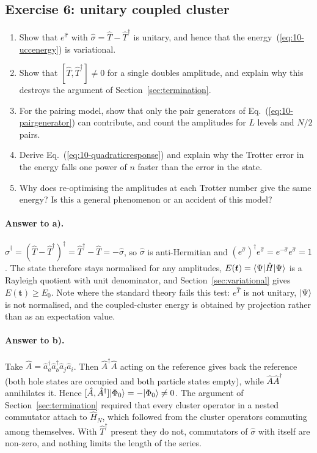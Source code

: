 \subsection*{Exercise 6: unitary coupled cluster}
\label{ex:10-ucc}

\begin{enumerate}
  \item[a)] Show that $e^{\hat{\sigma}}$ with
  $\hat{\sigma}=\hat{T}-\hat{T}^{\dagger}$ is unitary, and hence that the
  energy~(\ref{eq:10-uccenergy}) is variational.
  \item[b)] Show that $[\hat{T},\hat{T}^{\dagger}]\ne0$ for a single doubles
  amplitude, and explain why this destroys the argument of
  Section~\ref{sec:termination}.
  \item[c)] For the pairing model, show that only the pair generators of
  Eq.~(\ref{eq:10-pairgenerator}) can contribute, and count the amplitudes
  for $L$ levels and $N/2$ pairs.
  \item[d)] Derive Eq.~(\ref{eq:10-quadraticresponse}) and explain why the
  Trotter error in the energy falls one power of $n$ faster than the error in
  the state.
  \item[e)] Why does re-optimising the amplitudes at each Trotter number give
  the same energy?  Is this a general phenomenon or an accident of this
  model?
\end{enumerate}

\paragraph{Answer to a).}
$\hat{\sigma}^{\dagger}=(\hat{T}-\hat{T}^{\dagger})^{\dagger}
=\hat{T}^{\dagger}-\hat{T}=-\hat{\sigma}$, so $\hat{\sigma}$ is
anti-Hermitian and
$(e^{\hat{\sigma}})^{\dagger}e^{\hat{\sigma}}
=e^{-\hat{\sigma}}e^{\hat{\sigma}}=1$.  The state therefore stays normalised
for any amplitudes, $E(\bm{t})=\langle \Psi | \hat{H} | \Psi \rangle$ is a Rayleigh
quotient with unit denominator, and Section~\ref{sec:variational} gives
$E(\bm{t})\ge E_0$.  Note where the standard theory fails this test:
$e^{\hat{T}}$ is not unitary, $\vert \Psi \rangle$ is not normalised, and the
coupled-cluster energy is obtained by projection rather than as an
expectation value.

\paragraph{Answer to b).}
Take $\hat{A}=\hat{a}^{\dagger}_a\hat{a}^{\dagger}_b\hat{a}_j\hat{a}_i$.
Then $\hat{A}^{\dagger}\hat{A}$ acting on the reference gives back the
reference (both hole states are occupied and both particle states empty),
while $\hat{A}\hat{A}^{\dagger}$ annihilates it.  Hence
$[\hat{A},\hat{A}^{\dagger}]\vert \Phi_0 \rangle=-\vert \Phi_0 \rangle\ne0$.  The
argument of Section~\ref{sec:termination} required that every cluster
operator in a nested commutator attach to $\hat{H}_N$, which followed from
the cluster operators commuting among themselves.  With
$\hat{T}^{\dagger}$ present they do not, commutators of $\hat{\sigma}$ with
itself are non-zero, and nothing limits the length of the series.

